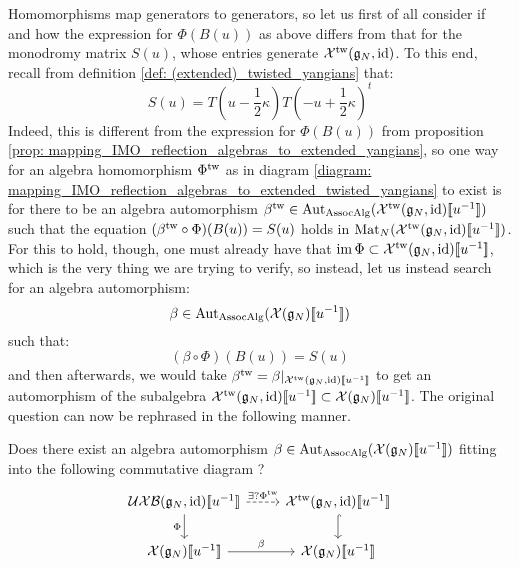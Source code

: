         Homomorphisms map generators to generators, so let us first of all consider if and how the expression for $\Phi( B(u) )$ as above differs from that for the monodromy matrix $S(u)$, whose entries generate $\mathcal{X}^{\mathrm{tw}}(\mathfrak{g}_N, \mathrm{id})$. To this end, recall from definition \ref{def: (extended)_twisted_yangians} that:
            $$S(u) = T\left(u - \frac12 \kappa\right) T\left(-u + \frac12 \kappa\right)^t$$
        Indeed, this is different from the expression for $\Phi(B(u))$ from proposition \ref{prop: mapping_IMO_reflection_algebras_to_extended_yangians}, so one way for an algebra homomorphism $\Phi^{\mathrm{tw}}$ as in diagram \eqref{diagram: mapping_IMO_reflection_algebras_to_extended_twisted_yangians} to exist is for there to be an algebra automorphism $\beta^{\mathrm{tw}} \in \operatorname{Aut}_{\mathrm{Assoc}\mathrm{Alg}}( \mathcal{X}^{\mathrm{tw}}(\mathfrak{g}_N, \mathrm{id})[\![u^{-1}]\!] )$ such that the equation $(\beta^{\mathrm{tw}} \circ \Phi)( B(u) ) = S(u)$ holds in $\operatorname{Mat}_N(\mathcal{X}^{\mathrm{tw}}(\mathfrak{g}_N, \mathrm{id})[\![u^{-1}]\!])$. For this to hold, though, one must already have that $\operatorname{im} \Phi \subset \mathcal{X}^{\mathrm{tw}}( \mathfrak{g}_N, \mathrm{id} )[\![u^{-1}]\!]$, which is the very thing we are trying to verify, so instead, let us instead search for an algebra automorphism:
            $$\beta \in \operatorname{Aut}_{\mathrm{Assoc}\mathrm{Alg}}( \mathcal{X}(\mathfrak{g}_N)[\![u^{-1}]\!] )$$
        such that:
            \begin{equation} \label{equation: B_matrix_S_matrix_compatibility}
                (\beta \circ \Phi)( B(u) ) = S(u)
            \end{equation}
        and then afterwards, we would take $\beta^{\mathrm{tw}} = \beta|_{ \mathcal{X}^{\mathrm{tw}}( \mathfrak{g}_N, \mathrm{id} )[\![u^{-1}]\!] }$ to get an automorphism of the subalgebra $\mathcal{X}^{\mathrm{tw}}(\mathfrak{g}_N, \mathrm{id})[\![u^{-1}]\!] \subset \mathcal{X}(\mathfrak{g}_N)[\![u^{-1}]\!]$. The original question can now be rephrased in the following manner.
        \begin{question}
            Does there exist an algebra automorphism $\beta \in \operatorname{Aut}_{\mathrm{Assoc}\mathrm{Alg}}( \mathcal{X}(\mathfrak{g}_N)[\![u^{-1}]\!] )$ fitting into the following commutative diagram ?
                \begin{equation} \label{diagram: mapping_IMO_reflection_algebras_to_extended_twisted_yangians_via_untwisted_automorphisms}
                    \begin{tikzcd}
                    {\UXB(\g_N, \id)[\![u^{-1}]\!]} & {\calX^{\tw}(\g_N, \id)[\![u^{-1}]\!]} \\
                    {\calX(\g_N)[\![u^{-1}]\!]} & {\calX(\g_N)[\![u^{-1}]\!]}
                    \arrow["{\exists ? \Phi^{\tw}}", dashed, from=1-1, to=1-2]
                    \arrow["\Phi"', from=1-1, to=2-1]
                    \arrow[hook, from=1-2, to=2-2]
                    \arrow["\beta", from=2-1, to=2-2]
                    \end{tikzcd}
                \end{equation}
        \end{question}
        

